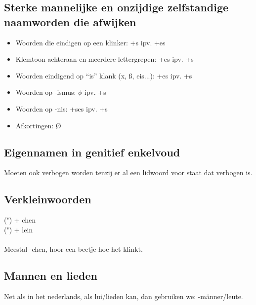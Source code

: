 \documentclass[main.tex]{subfiles}
\begin{document}
\subsection{Sterke mannelijke en onzijdige zelfstandige naamworden die afwijken}
\begin{itemize}
\item Woorden die eindigen op een klinker: +s ipv. +es
\item Klemtoon achteraan en meerdere lettergrepen:	+es ipv. +s
\item Woorden eindigend op “is” klank (x, ß, eis...):	+es ipv. +s
\item Woorden op -ismus:					$\phi$ ipv. +s
\item Woorden op -nis:				+ses ipv. +s
\item Afkortingen:						Ø
\end{itemize}

\subsection{Eigennamen in genitief enkelvoud}
Moeten ook verbogen worden tenzij er al een lidwoord voor staat dat verbogen is.
\subsection{Verkleinwoorden}
(") + chen\\
(") + lein\\
\\
Meestal -chen, hoor een beetje hoe het klinkt.
\subsection{Mannen en lieden}
Net als in het nederlands, als lui/lieden kan, dan gebruiken we: -männer/leute.
\end{document}
